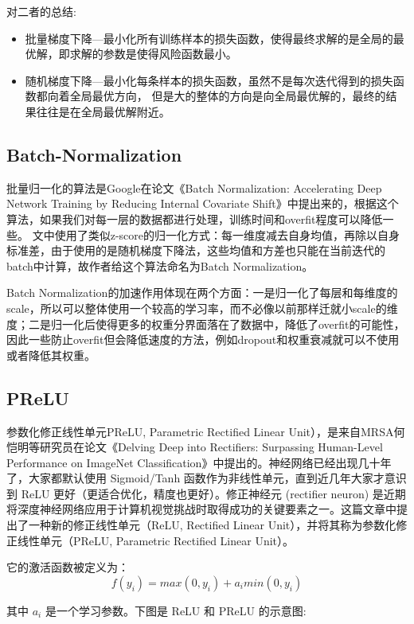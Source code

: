 对二者的总结:

\begin{itemize}
\item 批量梯度下降---最小化所有训练样本的损失函数，使得最终求解的是全局的最优解，即求解的参数是使得风险函数最小。
\item 随机梯度下降---最小化每条样本的损失函数，虽然不是每次迭代得到的损失函数都向着全局最优方向， 但是大的整体的方向是向全局最优解的，最终的结果往往是在全局最优解附近。
\end{itemize}

\subsection{Batch-Normalization}
批量归一化的算法是Google在论文《Batch Normalization: Accelerating Deep Network Training by Reducing Internal Covariate Shift》中提出来的，根据这个算法，如果我们对每一层的数据都进行处理，训练时间和overfit程度可以降低一些。 文中使用了类似z-score的归一化方式：每一维度减去自身均值，再除以自身标准差，由于使用的是随机梯度下降法，这些均值和方差也只能在当前迭代的batch中计算，故作者给这个算法命名为Batch Normalization。

Batch Normalization的加速作用体现在两个方面：一是归一化了每层和每维度的scale，所以可以整体使用一个较高的学习率，而不必像以前那样迁就小scale的维度；二是归一化后使得更多的权重分界面落在了数据中，降低了overfit的可能性，因此一些防止overfit但会降低速度的方法，例如dropout和权重衰减就可以不使用或者降低其权重。

\subsection{PReLU}
参数化修正线性单元PReLU, Parametric Rectified Linear Unit），是来自MRSA何恺明等研究员在论文《Delving Deep into Rectifiers: Surpassing Human-Level Performance on ImageNet Classification》中提出的。神经网络已经出现几十年了，大家都默认使用 Sigmoid/Tanh 函数作为非线性单元，直到近几年大家才意识到 ReLU 更好（更适合优化，精度也更好）。修正神经元 (rectifier neuron) 是近期将深度神经网络应用于计算机视觉挑战时取得成功的关键要素之一。这篇文章中提出了一种新的修正线性单元（ReLU, Rectified Linear Unit），并将其称为参数化修正线性单元（PReLU, Parametric Rectified Linear Unit）。

它的激活函数被定义为：
\begin{displaymath}
f(y_i) = max(0,y_i)+a_imin(0,y_i)
\end{displaymath}

其中 $a_i$ 是一个学习参数。下图是 ReLU 和 PReLU 的示意图:


